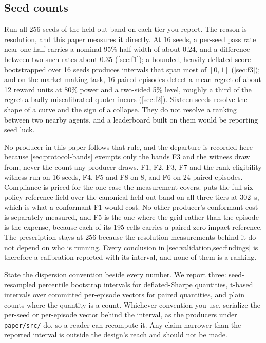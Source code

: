 \subsection{Seed counts}\label{sec:protocol-seeds}

Run all 256 seeds of the held-out band on each tier you report. The reason is resolution, and this paper measures it directly. At 16 seeds, a per-seed pass rate near one half carries a nominal 95\% half-width of about $0.24$, and a difference between two such rates about $0.35$ (\cref{sec:f1}); a bounded, heavily deflated score bootstrapped over 16 seeds produces intervals that span most of $[0,1]$ (\cref{sec:f3}); and on the market-making task, 16 paired episodes detect a mean regret of about 12 reward units at 80\% power and a two-sided 5\% level, roughly a third of the regret a badly miscalibrated quoter incurs (\cref{sec:f2}). Sixteen seeds resolve the shape of a curve and the sign of a collapse. They do not resolve a ranking between two nearby agents, and a leaderboard built on them would be reporting seed luck.

No producer in this paper follows that rule, and the departure is recorded here because \cref{sec:protocol-bands} exempts only the bands F3 and the witness draw from, never the count any producer draws. F1, F2, F3, F7 and the rank-eligibility witness run on 16 seeds, F4, F5 and F8 on 8, and F6 on 24 paired episodes. Compliance is priced for the one case the measurement covers.  puts the full six-policy reference field over the canonical held-out band on all three tiers at \SI{302}{\second}, which is what a conformant F1 would cost. No other producer's conformant cost is separately measured, and F5 is the one where the grid rather than the episode is the expense, because each of its 195 cells carries a paired zero-impact reference. The prescription stays at 256 because the resolution measurements behind it do not depend on who is running. Every conclusion in \cref{sec:validation,sec:findings} is therefore a calibration reported with its interval, and none of them is a ranking.

State the dispersion convention beside every number. We report three: seed-resampled percentile bootstrap intervals for deflated-Sharpe quantities, t-based intervals over committed per-episode vectors for paired quantities, and plain counts where the quantity is a count. Whichever convention you use, serialize the per-seed or per-episode vector behind the interval, as the producers under \texttt{paper/src/} do, so a reader can recompute it. Any claim narrower than the reported interval is outside the design's reach and should not be made.

